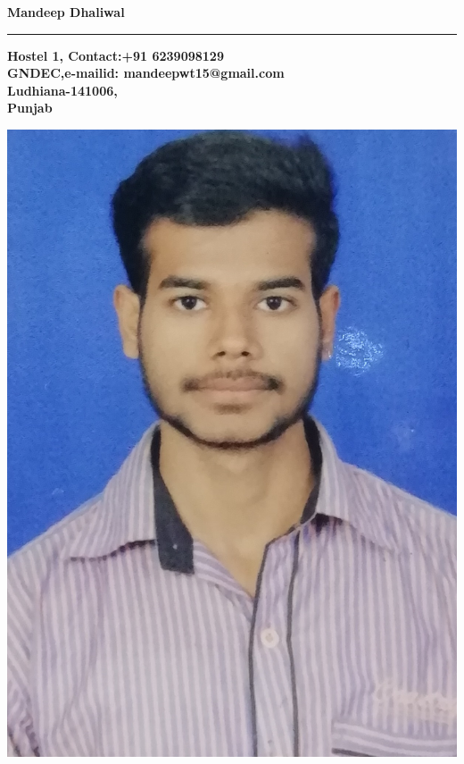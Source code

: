 \documentclass[10pt,doublespace]{article}
\begin{document}
\begin{center}
\large \textbf{Mandeep Dhaliwal\\}
\rule{\textwidth}{1pt}
\end{center}
{\bf \footnotesize
\noindent
Hostel 1, \hfill Contact:+91 6239098129 ~~~~~~~~~~~~~~\\
GNDEC,\hfill e-mailid: mandeepwt15@gmail.com\\
Ludhiana-141006,\\
Punjab
}

\begin{flushright}
\includegraphics[scale=0.05]{me.jpg}
~~~~~~~~~~~~~~~~~~~~~~~~
\end{flushright}
 ~~ \\
\end{document}
